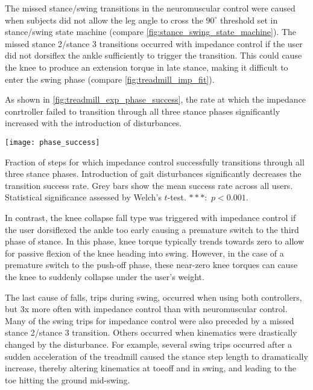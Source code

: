 The missed stance/swing transitions in the neuromuscular control were caused
when subjects did not allow the leg angle to cross the $90^\circ$ threshold set
in stance/swing state machine (compare \cref{fig:stance_swing_state_machine}).
The missed stance 2/stance 3 transitions occurred with impedance control if the
user did not dorsiflex the ankle sufficiently to trigger the transition. This
could cause the knee to produce an extension torque in late stance, making it
difficult to enter the swing phase (compare \cref{fig:treadmill_imp_fit}).

As shown in \cref{fig:treadmill_exp_phase_success}, the rate at which the
impedance conrtroller failed to transition through all three stance phases
significantly increased with the introduction of disturbances.
\begin{marginfigure}
    \centering 
    \texttt{[image: phase\_success]}
    \caption{Fraction of steps for which impedance control successfully
    transitions through all three stance phases. Introduction of gait
    disturbances significantly decreases the transition success rate. Grey bars
    show the mean success rate across all users. Statistical significance
    assessed by Welch's $t$-test. $***$:~$p <
    0.001$.}\label{fig:treadmill_exp_phase_success}
\end{marginfigure}

In contrast, the knee collapse fall type was triggered with impedance control if
the user dorsiflexed the ankle too early causing a premature switch to the third
phase of stance. In this phase, knee torque typically trends towards zero to
allow for passive flexion of the knee heading into swing. However, in the case
of a premature switch to the push-off phase, these near-zero knee torques can
cause the knee to suddenly collapse under the user's weight. 

The last cause of falls, trips during swing, occurred when using both
controllers, but 3x more often with impedance control than with neuromuscular
control. Many of the swing trips for impedance control were also preceded by a
missed stance 2/stance 3 transition. Others occurred when kinematics were
drastically changed by the disturbance. For example, several swing trips
occurred after a sudden acceleration of the treadmill caused the stance step
length to dramatically increase, thereby altering kinematics at toeoff and in
swing, and leading to the toe hitting the ground mid-swing.

